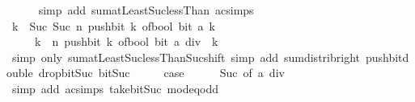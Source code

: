 \begin{isabellebody}
\ \ \ \ \isamarkupfalse%
\ {\isacharparenleft}{\kern0pt}simp\ add{\isacharcolon}{\kern0pt}\ sum{\isachardot}{\kern0pt}atLeast{\isacharunderscore}{\kern0pt}Suc{\isacharunderscore}{\kern0pt}lessThan\ ac{\isacharunderscore}{\kern0pt}simps{\isacharparenright}{\kern0pt}\isanewline
\ \ \isamarkupfalse%
\ \isamarkupfalse%
\ {\isachardoublequoteopen}{\isacharparenleft}{\kern0pt}{\isasymSum}k\ {\isacharequal}{\kern0pt}\ Suc\ {}{\isachardot}{\kern0pt}{\isachardot}{\kern0pt}{\isacharless}{\kern0pt}Suc\ n{\isachardot}{\kern0pt}\ push{\isacharunderscore}{\kern0pt}bit\ k\ {\isacharparenleft}{\kern0pt}of{\isacharunderscore}{\kern0pt}bool\ {\isacharparenleft}{\kern0pt}bit\ a\ k{\isacharparenright}{\kern0pt}{\isacharparenright}{\kern0pt}{\isacharparenright}{\kern0pt}\isanewline
\ \ \ \ {\isacharequal}{\kern0pt}\ {\isacharparenleft}{\kern0pt}{\isasymSum}k\ {\isacharequal}{\kern0pt}\ {}{\isachardot}{\kern0pt}{\isachardot}{\kern0pt}{\isacharless}{\kern0pt}n{\isachardot}{\kern0pt}\ push{\isacharunderscore}{\kern0pt}bit\ k\ {\isacharparenleft}{\kern0pt}of{\isacharunderscore}{\kern0pt}bool\ {\isacharparenleft}{\kern0pt}bit\ {\isacharparenleft}{\kern0pt}a\ div\ {}{\isacharparenright}{\kern0pt}\ k{\isacharparenright}{\kern0pt}{\isacharparenright}{\kern0pt}{\isacharparenright}{\kern0pt}\ {\isacharasterisk}{\kern0pt}\ {}{\isachardoublequoteclose}\isanewline
\ \ \ \ \isamarkupfalse%
\ {\isacharparenleft}{\kern0pt}simp\ only{\isacharcolon}{\kern0pt}\ sum{\isachardot}{\kern0pt}atLeast{\isacharunderscore}{\kern0pt}Suc{\isacharunderscore}{\kern0pt}lessThan{\isacharunderscore}{\kern0pt}Suc{\isacharunderscore}{\kern0pt}shift{\isacharparenright}{\kern0pt}\ {\isacharparenleft}{\kern0pt}simp\ add{\isacharcolon}{\kern0pt}\ sum{\isacharunderscore}{\kern0pt}distrib{\isacharunderscore}{\kern0pt}right\ push{\isacharunderscore}{\kern0pt}bit{\isacharunderscore}{\kern0pt}double\ drop{\isacharunderscore}{\kern0pt}bit{\isacharunderscore}{\kern0pt}Suc\ bit{\isacharunderscore}{\kern0pt}Suc{\isacharparenright}{\kern0pt}\isanewline
\ \ \isamarkupfalse%
\ \isamarkupfalse%
\ {\isacharquery}{\kern0pt}case\isanewline
\ \ \ \ \isamarkupfalse%
\ Suc\ {\isacharbrackleft}{\kern0pt}of\ {\isachardoublequoteopen}a\ div\ {}{\isachardoublequoteclose}{\isacharbrackright}{\kern0pt}\ \isamarkupfalse%
\ {\isacharparenleft}{\kern0pt}simp\ add{\isacharcolon}{\kern0pt}\ ac{\isacharunderscore}{\kern0pt}simps\ take{\isacharunderscore}{\kern0pt}bit{\isacharunderscore}{\kern0pt}Suc\ mod{\isacharunderscore}{\kern0pt}{}{\isacharunderscore}{\kern0pt}eq{\isacharunderscore}{\kern0pt}odd{\isacharparenright}{\kern0pt}\isanewline

\end{isabellebody}
